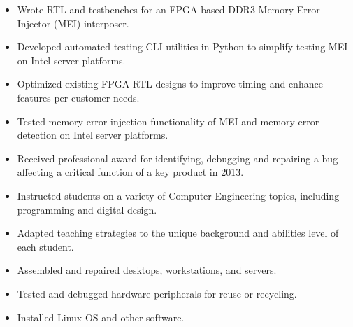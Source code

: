\documentclass{article}
\begin{document}
\vspace{3pt}


	\begin{itemize}\setlength{\itemsep}{-4pt}
		\item Wrote RTL and testbenches for an FPGA-based DDR3 Memory Error Injector (MEI) interposer.
		\item Developed automated testing CLI utilities in Python to simplify testing MEI on Intel server platforms.
		\item Optimized existing FPGA RTL designs to improve timing and enhance features per customer needs.
		\item Tested memory error injection functionality of MEI and memory error detection on Intel server platforms.
		\item Received professional award for identifying, debugging and repairing a bug affecting a critical function of a key product in 2013.

	\end{itemize} 


	\begin{itemize}\setlength{\itemsep}{-4pt}
		\item Instructed students on a variety of Computer Engineering topics, including programming and digital design.
		\item Adapted teaching strategies to the unique background and abilities level of each student.
	\end{itemize}

	
	\begin{itemize} \setlength{\itemsep}{-4pt}
		\item Assembled and repaired desktops, workstations, and servers.
		\item Tested and debugged hardware peripherals for reuse or recycling.		
		\item Installed Linux OS and other software.
	\end{itemize}
	
	
\end{document}

